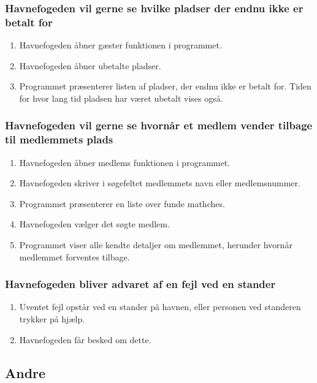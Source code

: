     \subsubsection{Havnefogeden vil gerne se hvilke pladser der endnu ikke er betalt for}
    \begin{enumerate}
      \item Havnefogeden åbner gæster funktionen i programmet.
      \item Havnefogeden åbner ubetalte pladser.
      \item Programmet præsenterer listen af pladser, der endnu ikke er betalt for. Tiden for hvor lang tid pladsen har været ubetalt vises også.
    \end{enumerate}

    \subsubsection{Havnefogeden vil gerne se hvornår et medlem vender tilbage til medlemmets plads}
    \begin{enumerate}
      \item Havnefogeden åbner medlems funktionen i programmet.
      \item Havnefogeden skriver i søgefeltet medlemmets navn eller medlemsnummer.
      \item Programmet præsenterer en liste over funde mathches.
      \item Havnefogeden vælger det søgte medlem.
      \item Programmet viser alle kendte detaljer om medlemmet, herunder hvornår medlemmet forventes tilbage.
    \end{enumerate}

    \subsubsection{Havnefogeden bliver advaret af en fejl ved en stander}
    \begin{enumerate}
      \item Uventet fejl opstår ved en stander på havnen, eller personen ved standeren trykker på hjælp.
      \item Havnefogeden får besked om dette.
    \end{enumerate}

\subsection{Andre}

